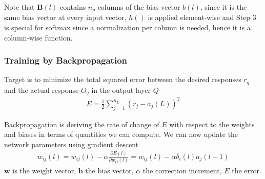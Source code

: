 Note that $\mathbf{B}(l)$ contains $n_p$ columns of the bias vector $b(l)$, since it is the same bias vector at every input vector, $h()$ is applied element-wise and Step 3 is special for softmax since a normalization per column is needed, hence it is a column-wise function.


\subsubsection{Training by Backpropagation}
Target is to minimize the total squared error between the desired responses
$r_q$ and the actual response $O_q$ in the output layer $Q$
\begin{align*}
	E = \frac{1}{2} \sum_{j=1}^{n_L}(r_j-a_j(L))^2
\end{align*}

Backpropagation is deriving the rate of change of $E$ with respect to the weights and biases in terms of quantities we can compute.
We can now update the network parameters using gradient descent
\begin{align*}
  w_{ij}(l) = w_{ij}(l) - \alpha \frac{\partial E(l)}{\partial w_{ij}(l)} = w_{ij}(l) - \alpha \delta_i(l)a_j(l-1)
\end{align*}
$\mathbf{w}$ is the weight vector, $\mathbf{b}$ the bias vector, $\alpha$ the correction increment, $E$ the error.

